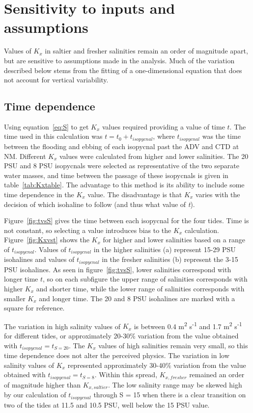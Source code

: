 \section{Sensitivity to inputs and assumptions} \label{sec:Sensitivity}

Values of $K_x$ in saltier and fresher salinities remain an order of magnitude apart, but are sensitive to assumptions made in the analysis. Much of the variation described below stems from the fitting of a one-dimensional equation that does not account for vertical variability. 

\subsection{Time dependence}

Using equation~\ref{eq:S} to get $K_x$ values required providing a value of time $t$. The time used in this calculation was $t=t_0 + t_{isopycnal}$, where $t_{isopycnal}$ was the time between the flooding and ebbing of each isopycnal past the ADV and CTD at NM. Different $K_x$ values were calculated from higher and lower salinities. The 20 PSU and 8 PSU isopycnals were selected as representative of the two separate water masses, and time between the passage of these isopycnals is given in table~\ref{tab:Kxtable}. The advantage to this method is its ability to include some time dependence in the $K_x$ value. The disadvantage is that $K_x$ varies with the decision of which isohaline to follow (and thus what value of \emph{t}). 

Figure~\ref{fig:tvsS} gives the time between each isopycnal for the four tides. Time is not constant, so selecting a value introduces bias to the $K_x$ calculation. Figure~\ref{fig:Kxvst} shows the $K_x$ for higher and lower salinities based on a range of $t_{isopycnal}$. Values of $t_{isopycnal}$ in the higher salinities (a) represent 15-29 PSU isohalines and values of $t_{isopycnal}$ in the fresher salinities (b) represent the 3-15 PSU isohalines. As seen in figure~\ref{fig:tvsS}, lower salinities correspond with longer time $t$, so on each subfigure the upper range of salinities corresponds with higher $K_x$ and shorter time, while the lower range of salinities corresponds with smaller $K_x$ and longer time. The 20 and 8 PSU isohalines are marked with a square for reference.

The variation in high salinity values of $K_x$ is between 0.4 m\textsuperscript{2} s\textsuperscript{-1} and 1.7 m\textsuperscript{2} s\textsuperscript{-1} for different tides, or approximately 20-30\% variation from the value obtained with $t_{isopycnal}=t_{S=20}$. The $K_x$ values of high salinities remain very small, so this time dependence does not alter the perceived physics. The variation in low salinity values of $K_x$ represented approximately 30-40\% variation from the value obtained with $t_{isopycnal}=t_{S=8}$. Within this spread, $K_{x,fresher}$ remained an order of magnitude higher than $K_{x,saltier}$. The low salinity range may be skewed high by our calculation of $t_{isopycnal}$ through S = 15 when there is a clear transition on two of the tides at 11.5 and 10.5 PSU, well below the 15 PSU value. 

